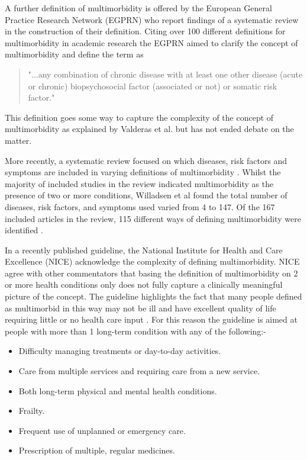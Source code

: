 \documentclass[12pt,]{report}
\providecommand{\tightlist}{%
  \setlength{\itemsep}{0pt}\setlength{\parskip}{0pt}}
\begin{document}
A further definition of multimorbidity is offered by the European
General Practice Research Network (EGPRN) who report findings of a
systematic review in the construction of their definition. Citing over
100 different definitions for multimorbidity in academic research the
EGPRN \citep[pp.1]{RN77} aimed to clarify the concept of multimorbidity
and define the term as

\begin{quotation} "...any combination of chronic disease with at least one other disease (acute or chronic) biopsychosocial factor (associated or not) or somatic risk factor." \end{quotation}

This definition goes some way to capture the complexity of the concept
of multimorbidity as explained by Valderas et al. \citeyearpar{RN64} but
has not ended debate on the matter.

More recently, a systematic review focused on which diseases, risk
factors and symptoms are included in varying definitions of
multimorbidity \citep{RN254}. Whilst the majority of included studies in
the review indicated multimorbidity as the presence of two or more
conditions, Willadsen et al \citeyearpar{RN254} found the total number
of diseases, risk factors, and symptoms used varied from 4 to 147. Of
the 167 included articles in the review, 115 different ways of defining
multimorbidity were identified \citep{RN254}.

In a recently published guideline, the National Institute for Health and
Care Excellence (NICE) \citep{RN226} acknowledge the complexity of
defining multimorbidity. NICE agree with other commentators \citep{RN21}
that basing the definition of multimorbidity on 2 or more health
conditions only does not fully capture a clinically meaningful picture
of the concept. The guideline highlights the fact that many people
defined as multimorbid in this way may not be ill and have excellent
quality of life requiring little or no health care input \citep{RN226}.
For this reason the guideline is aimed at people with more than 1
long-term condition with any of the following:-

\begin{itemize}
\tightlist
\item
  Difficulty managing treatments or day-to-day activities.
\item
  Care from multiple services and requiring care from a new service.
\item
  Both long-term physical and mental health conditions.
\item
  Frailty.
\item
  Frequent use of unplanned or emergency care.
\item
  Prescription of multiple, regular medicines.
\end{itemize}
\end{document}
